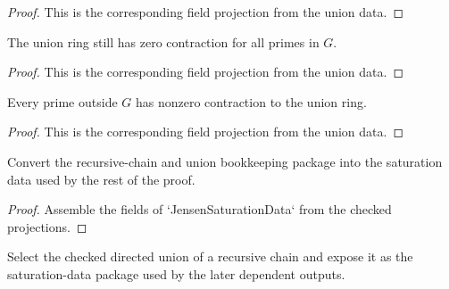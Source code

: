 \begin{proof}
  This is the corresponding field projection from the union data.
\end{proof}

\begin{lemma}
  \label{lem:jensen_saturation_union_avoid}
  The union ring still has zero contraction for all primes in \(G\).
\end{lemma}

\begin{proof}
  This is the corresponding field projection from the union data.
\end{proof}

\begin{lemma}
  \label{lem:jensen_saturation_union_hits_outside_g}
  Every prime outside \(G\) has nonzero contraction to the union ring.
\end{lemma}

\begin{proof}
  This is the corresponding field projection from the union data.
\end{proof}

\begin{definition}
  \label{def:jensen_saturation_union_to_saturation_data}
  Convert the recursive-chain and union bookkeeping package into the
  saturation data used by the rest of the proof.
\end{definition}

\begin{proof}
  Assemble the fields of `JensenSaturationData` from the checked projections.
\end{proof}

\begin{definition}
  \label{def:jensen_saturation_data_of_recursive_chain}
  Select the checked directed union of a recursive chain and expose it as the
  saturation-data package used by the later dependent outputs.
\end{definition}

